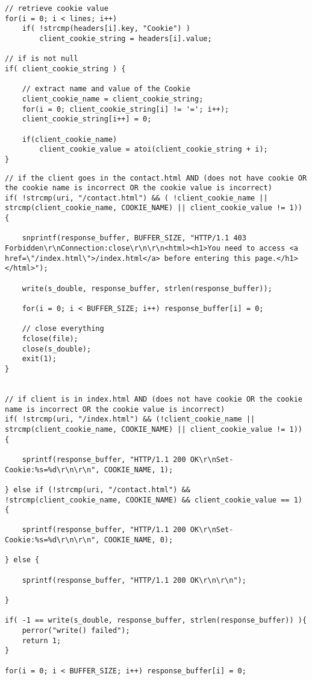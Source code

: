 \begin{lstlisting}
// retrieve cookie value
for(i = 0; i < lines; i++)
    if( !strcmp(headers[i].key, "Cookie") )
        client_cookie_string = headers[i].value;

// if is not null
if( client_cookie_string ) {

    // extract name and value of the Cookie
    client_cookie_name = client_cookie_string;
    for(i = 0; client_cookie_string[i] != '='; i++);
    client_cookie_string[i++] = 0;
    
    if(client_cookie_name)
        client_cookie_value = atoi(client_cookie_string + i);
}
\end{lstlisting}

\begin{lstlisting}
// if the client goes in the contact.html AND (does not have cookie OR the cookie name is incorrect OR the cookie value is incorrect)
if( !strcmp(uri, "/contact.html") && ( !client_cookie_name || strcmp(client_cookie_name, COOKIE_NAME) || client_cookie_value != 1)) {
    
    snprintf(response_buffer, BUFFER_SIZE, "HTTP/1.1 403 Forbidden\r\nConnection:close\r\n\r\n<html><h1>You need to access <a href=\"/index.html\">/index.html</a> before entering this page.</h1></html>");

    write(s_double, response_buffer, strlen(response_buffer));

    for(i = 0; i < BUFFER_SIZE; i++) response_buffer[i] = 0;

    // close everything
    fclose(file);
    close(s_double);
    exit(1);
}


// if client is in index.html AND (does not have cookie OR the cookie name is incorrect OR the cookie value is incorrect)
if( !strcmp(uri, "/index.html") && (!client_cookie_name || strcmp(client_cookie_name, COOKIE_NAME) || client_cookie_value != 1)) {

    sprintf(response_buffer, "HTTP/1.1 200 OK\r\nSet-Cookie:%s=%d\r\n\r\n", COOKIE_NAME, 1);

} else if (!strcmp(uri, "/contact.html") && !strcmp(client_cookie_name, COOKIE_NAME) && client_cookie_value == 1) {
    
    sprintf(response_buffer, "HTTP/1.1 200 OK\r\nSet-Cookie:%s=%d\r\n\r\n", COOKIE_NAME, 0);

} else {

    sprintf(response_buffer, "HTTP/1.1 200 OK\r\n\r\n");

}

if( -1 == write(s_double, response_buffer, strlen(response_buffer)) ){
    perror("write() failed");
    return 1;
}

for(i = 0; i < BUFFER_SIZE; i++) response_buffer[i] = 0;
\end{lstlisting}




